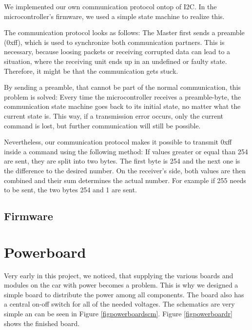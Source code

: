 \documentclass[a4paper
               ,10pt
               ,DIV=10 %
               ,BCOR=0.3cm
               ,pagesize %
               ,headings=small
               ,bibtotoc
               ]
               {scrartcl}
\begin{document}
We implemented our own communication protocol ontop of I2C.
In the microcontroller's firmware, we used a simple state machine to realize this.

The communication protocol looks as follows:
The Master first sends a preamble (0xff), which is used to synchronize both communication partners.
This is necessary, because loosing packets or receiving corrupted data can lead to a situation, where the receiving unit ends up in an undefined or faulty state.
Therefore, it might be that the communication gets stuck.

By sending a preamble, that cannot be part of the normal communication, this problem is solved: Every time the microcontroller receives a preamble-byte, the communication state machine goes back to its initial state, no matter what the current state is.
This way, if a transmission error occurs, only the current command is lost, but further communication will still be possible.


Nevertheless, our communication protocol makes it possible to transmit 0xff inside a command using the following method:
If values greater or equal than 254 are sent, they are split into two bytes.
The first byte is 254 and the next one is the difference to the desired number.
On the receiver's side, both values are then combined and their sum determines the actual number. 
For example if 255 needs to be sent, the two bytes 254 and 1 are sent.

\subsection{Firmware}

\section{Powerboard}
Very early in this project, we noticed, that supplying the various boards and modules on the car with power becomes a problem.
This is why we designed a simple board to distribute the power among all components.
The board also has a central on-off switch for all of the needed voltages.
The schematics are very simple an can be seen in Figure \ref{figpowerboardscm}. Figure \ref{figpowerboardr} shows the finished board.
\end{document}
